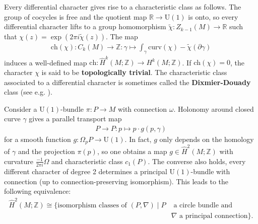     \begin{property}
        Every differential character gives rise to a characteristic class as follows. The group of cocycles is free and the quotient map $\mathbb{R}\rightarrow\mathrm{U}(1)$ is onto, so every differential character lifts to a group homomorphism $\widetilde{\chi}:Z_{k-1}(M)\rightarrow\mathbb{R}$ such that $\chi(z)=\exp(2\pi i\widetilde{\chi}(z))$. The map
        \begin{gather}
            \label{bundle:characteristic_class}
            \mathrm{ch}(\chi):C_k(M)\rightarrow\mathbb{Z}:\gamma\mapsto\int_\gamma\mathrm{curv}(\chi)-\widetilde{\chi}(\partial\gamma)
        \end{gather}
        induces a well-defined map $\mathrm{ch}:\hat{H}^k(M;\mathbb{Z})\rightarrow H^k(M;\mathbb{Z})$. If $\mathrm{ch}(\chi)=0$, the character $\chi$ is said to be \textbf{topologically trivial}. The characteristic class associated to a differential character is sometimes called the \textbf{Dixmier-Douady} class (see e.g. \cite{brylinski}).
    \end{property}

    \begin{example}
        Consider a $\mathrm{U}(1)$-bundle $\pi:P\rightarrow M$ with connection $\omega$. Holonomy around closed curve $\gamma$ gives a parallel transport map
        \begin{gather}
            P\rightarrow P:p\mapsto p\cdot g(p,\gamma)
        \end{gather}
        for a smooth function $g:\Omega_p P\rightarrow\mathrm{U}(1)$. In fact, $g$ only depends on the homology of $\gamma$ and the projection $\pi(p)$, so one obtains a map $g\in\hat{H}^2(M;\mathbb{Z})$ with curvature $\frac{-1}{2\pi i}\Omega$ and characteristic class $c_1(P)$. The converse also holds, every different character of degree 2 determines a principal $\mathrm{U}(1)$-bundle with connection (up to connection-preserving isomorphism). This leads to the following equivalence:
        \begin{align}
            \hat{H}^2(M;\mathbb{Z})\cong\{\text{isomorphism classes of }(P,\nabla)\mid P&\text{ a circle bundle and }\\
            &\nabla\text{ a principal connection}\}.\nonumber
        \end{align}
    \end{example}

